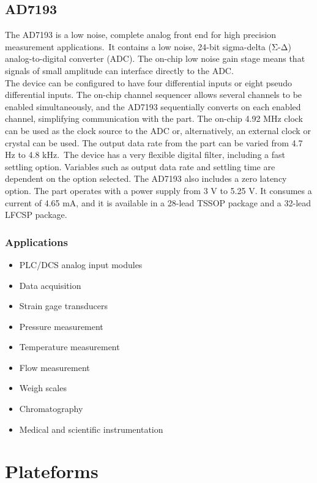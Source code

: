 \documentclass[10pt,a4paper]{report}
\begin{document}
\subsection{AD7193}
The AD7193 is a low noise, complete analog front end for high precision measurement applications.\ It contains a low noise, 24-bit sigma-delta (Σ-Δ) analog-to-digital converter (ADC). The on-chip low noise
gain stage means that signals of small amplitude can interface directly to the ADC.\\
The device can be configured to have four differential inputs or eight pseudo differential inputs. The on-chip channel sequencer allows several channels to be enabled simultaneously, and the AD7193 sequentially converts on each enabled channel, simplifying communication with the part. The on-chip 4.92 MHz clock can be used as the clock source to the ADC or, alternatively, an external clock or crystal can be used. The output data rate from the part can be varied from 4.7 Hz to 4.8 kHz.\
The device has a very flexible digital filter, including a fast settling option. Variables such as output data rate and settling time are dependent on the option selected. The AD7193 also includes a zero latency option.
The part operates with a power supply from 3 V to 5.25 V. It consumes a current of 4.65 mA, and it is available in a 28-lead TSSOP package and a 32-lead LFCSP package.

\subsubsection*{Applications} 

\begin{itemize}

\item PLC/DCS analog input modules
\item Data acquisition
\item Strain gage transducers
\item Pressure measurement
\item Temperature measurement
\item Flow measurement
\item Weigh scales
\item Chromatography
\item Medical and scientific instrumentation \\

\end{itemize}
\section{Plateforms}
\end{document}
